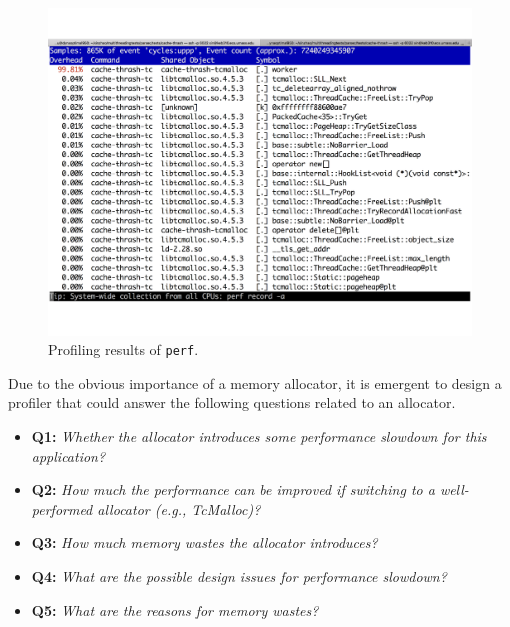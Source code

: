 \begin{figure}[!ht]
\centering
\includegraphics[width=0.9\columnwidth]{figures/perf-cache-thrash-tcmalloc}
\caption{Profiling results of \texttt{perf}. \label{fig:mot1}}
\end{figure}


Due to the obvious importance of a memory allocator, it is emergent to design a profiler that could answer the following questions related to an allocator. \\

\begin{itemize}
\item \textbf{Q1:} \textit{Whether the allocator introduces some performance slowdown for this application? }
\item \textbf{Q2:} \textit{How much the performance can be improved if switching to a well-performed allocator (e.g., TcMalloc)?}
\item \textbf{Q3:} \textit{How much memory wastes the allocator introduces?}
\item \textbf{Q4:} \textit{What are the possible design issues for performance slowdown?}
\item \textbf{Q5:} \textit{What are the reasons for memory wastes?} 
\end{itemize}
\vspace{0.1in}

